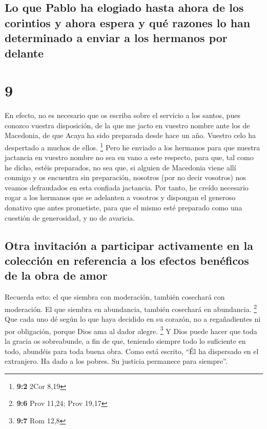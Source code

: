 \hypertarget{lo-que-pablo-ha-elogiado-hasta-ahora-de-los-corintios-y-ahora-espera-y-quuxe9-razones-lo-han-determinado-a-enviar-a-los-hermanos-por-delante}{%
\subsection{Lo que Pablo ha elogiado hasta ahora de los corintios y
ahora espera y qué razones lo han determinado a enviar a los hermanos
por
delante}\label{lo-que-pablo-ha-elogiado-hasta-ahora-de-los-corintios-y-ahora-espera-y-quuxe9-razones-lo-han-determinado-a-enviar-a-los-hermanos-por-delante}}

\hypertarget{section-8}{%
\section{9}\label{section-8}}

 En efecto, no es necesario que os escriba sobre el
servicio a los santos,  pues conozco vuestra disposición,
de la que me jacto en vuestro nombre ante los de Macedonia, de que Acaya
ha sido preparada desde hace un año. Vuestro celo ha despertado a muchos
de ellos. \footnote{\textbf{9:2} 2Cor 8,19}  Pero he
enviado a los hermanos para que nuestra jactancia en vuestro nombre no
sea en vano a este respecto, para que, tal como he dicho, estéis
preparados,  no sea que, si alguien de Macedonia viene
allí conmigo y os encuentra sin preparación, nosotros (por no decir
vosotros) nos veamos defraudados en esta confiada jactancia.
 Por tanto, he creído necesario rogar a los hermanos que
se adelanten a vosotros y dispongan el generoso donativo que antes
prometiste, para que el mismo esté preparado como una cuestión de
generosidad, y no de avaricia.

\hypertarget{otra-invitaciuxf3n-a-participar-activamente-en-la-colecciuxf3n-en-referencia-a-los-efectos-benuxe9ficos-de-la-obra-de-amor}{%
\subsection{Otra invitación a participar activamente en la colección en
referencia a los efectos benéficos de la obra de
amor}\label{otra-invitaciuxf3n-a-participar-activamente-en-la-colecciuxf3n-en-referencia-a-los-efectos-benuxe9ficos-de-la-obra-de-amor}}

 Recuerda esto: el que siembra con moderación, también
cosechará con moderación. El que siembra en abundancia, también
cosechará en abundancia. \footnote{\textbf{9:6} Prov 11,24; Prov 19,17}
 Que cada uno dé según lo que haya decidido en su corazón,
no a regañadientes ni por obligación, porque Dios ama al dador alegre.
\footnote{\textbf{9:7} Rom 12,8}  Y Dios puede hacer que
toda la gracia os sobreabunde, a fin de que, teniendo siempre todo lo
suficiente en todo, abundéis para toda buena obra.  Como
está escrito, ``Él ha dispersado en el extranjero. Ha dado a los pobres.
Su justicia permanece para siempre''.

